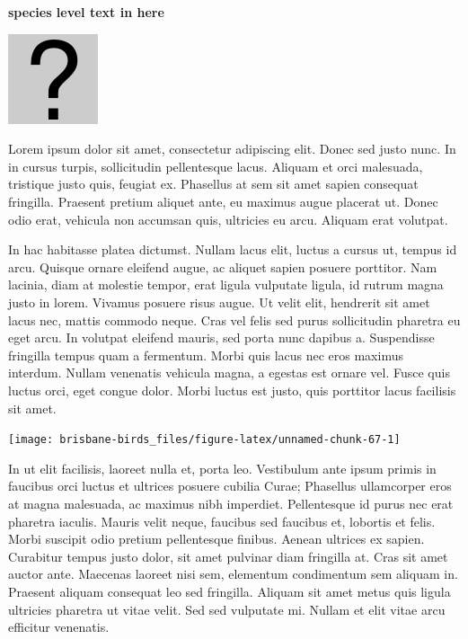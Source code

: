 \documentclass[]{book}
\let\origfigure\figure
\let\endorigfigure\endfigure
\renewenvironment{figure}[1][2] {
  \expandafter\origfigure\expandafter[H]
} {
  \endorigfigure
}
\begin{document}
\textbf{species level text in here}

\begin{figure}
\centering
\includegraphics{assets/missing.png}
\caption{No image for species}
\end{figure}

Lorem ipsum dolor sit amet, consectetur adipiscing elit. Donec sed justo
nunc. In in cursus turpis, sollicitudin pellentesque lacus. Aliquam et
orci malesuada, tristique justo quis, feugiat ex. Phasellus at sem sit
amet sapien consequat fringilla. Praesent pretium aliquet ante, eu
maximus augue placerat ut. Donec odio erat, vehicula non accumsan quis,
ultricies eu arcu. Aliquam erat volutpat.

In hac habitasse platea dictumst. Nullam lacus elit, luctus a cursus ut,
tempus id arcu. Quisque ornare eleifend augue, ac aliquet sapien posuere
porttitor. Nam lacinia, diam at molestie tempor, erat ligula vulputate
ligula, id rutrum magna justo in lorem. Vivamus posuere risus augue. Ut
velit elit, hendrerit sit amet lacus nec, mattis commodo neque. Cras vel
felis sed purus sollicitudin pharetra eu eget arcu. In volutpat eleifend
mauris, sed porta nunc dapibus a. Suspendisse fringilla tempus quam a
fermentum. Morbi quis lacus nec eros maximus interdum. Nullam venenatis
vehicula magna, a egestas est ornare vel. Fusce quis luctus orci, eget
congue dolor. Morbi luctus est justo, quis porttitor lacus facilisis sit
amet.

\begin{figure}
\texttt{[image: brisbane-birds\_files/figure-latex/unnamed-chunk-67-1]} \caption{insert figure caption}\label{fig:unnamed-chunk-67}
\end{figure}

In ut elit facilisis, laoreet nulla et, porta leo. Vestibulum ante ipsum
primis in faucibus orci luctus et ultrices posuere cubilia Curae;
Phasellus ullamcorper eros at magna malesuada, ac maximus nibh
imperdiet. Pellentesque id purus nec erat pharetra iaculis. Mauris velit
neque, faucibus sed faucibus et, lobortis et felis. Morbi suscipit odio
pretium pellentesque finibus. Aenean ultrices ex sapien. Curabitur
tempus justo dolor, sit amet pulvinar diam fringilla at. Cras sit amet
auctor ante. Maecenas laoreet nisi sem, elementum condimentum sem
aliquam in. Praesent aliquam consequat leo sed fringilla. Aliquam sit
amet metus quis ligula ultricies pharetra ut vitae velit. Sed sed
vulputate mi. Nullam et elit vitae arcu efficitur venenatis.
\end{document}
